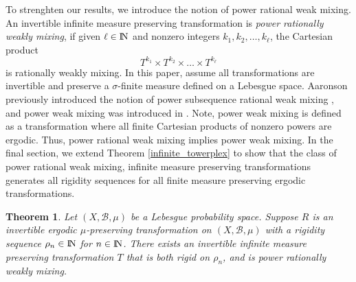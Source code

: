 \documentclass[12pt]{amsart}
\newtheorem{theorem}{Theorem}[section]
\begin{document}
To strenghten our results, we introduce the notion 
of power rational weak mixing. 
An invertible infinite measure preserving transformation 
is {\it power rationally weakly mixing}, 
if given $\ell \in {\hbox{\rm\setbox1=\hbox{I}\copy1\kern-.45\wd1 N}}$ and nonzero 
integers $k_1,k_2,\ldots ,k_{\ell}$, 
the Cartesian product 
\[
T^{k_1}\times T^{k_2}\times \ldots \times T^{k_{\ell}}
\]
is rationally weakly mixing. 
In this paper, assume all transformations are invertible 
and preserve a $\sigma$-finite measure defined on a Lebesgue space. 
Aaronson previously introduced the notion 
of power subsequence rational weak mixing \cite{Aar13}, 
and power weak mixing was introduced in \cite{DGMS}. 
Note, power weak mixing is defined as a transformation 
where all finite Cartesian products of nonzero powers 
are ergodic. Thus, power rational weak mixing 
implies power weak mixing. 
In the final section, we extend 
Theorem \ref{infinite_towerplex} to show that 
the class of power rational weak mixing, 
infinite measure preserving transformations 
generates all rigidity sequences 
for all finite measure preserving ergodic transformations. 
\begin{theorem}
\label{infinite_towerplex2}
Let $(X,\mathcal{B},\mu)$ be a Lebesgue probability space. 
Suppose $R$ is an invertible ergodic $\mu$-preserving transformation 
on $(X,\mathcal{B},\mu)$ with a rigidity sequence 
$\rho_n \in {\hbox{\rm\setbox1=\hbox{I}\copy1\kern-.45\wd1 N}}$ for $n\in {\hbox{\rm\setbox1=\hbox{I}\copy1\kern-.45\wd1 N}}$. 
There exists an invertible infinite measure preserving transformation 
$T$ that is both rigid on $\rho_n$, 
and is {\it power} rationally weakly mixing. 
\end{theorem}
\end{document}
